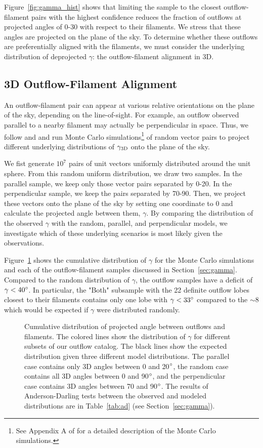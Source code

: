 \documentclass[twocolumn]{aastex63}
\begin{document}
Figure~\ref{fig:gamma_hist} shows that limiting the sample to the closest outflow-filament pairs with the highest confidence reduces the fraction of outflows at projected angles of 0-30\degr{} with respect to their filaments. We stress that these angles are projected on the plane of the sky. To determine whether these outflows are preferentially aligned with the filaments, we must consider the underlying distribution of deprojected $\gamma$: the outflow-filament alignment in 3D.

\subsection{3D Outflow-Filament Alignment}
An outflow-filament pair can appear at various relative orientations on the plane of the sky, depending on the line-of-sight. For example, an outflow observed parallel to a nearby filament may actually be perpendicular in space. Thus, we follow \citet{Stephens17} and \citet{Kong19} and run Monte Carlo simulations\footnote{See Appendix A of \citet{Stephens17} for a detailed description of the Monte Carlo simulations.} of random vector pairs to project different underlying distributions of $\gamma_{\rm 3D}$ onto the plane of the sky.

We fist generate $10^7$ pairs of unit vectors uniformly distributed around the unit sphere. From this random uniform distribution, we draw two samples. In the parallel sample, we keep only those vector pairs separated by 0-20\degr. In the perpendicular sample, we keep the pairs separated by 70-90\degr. Then, we project these vectors onto the plane of the sky by setting one coordinate to 0 and calculate the projected angle between them, $\gamma$. By comparing the distribution of the observed $\gamma$ with the random, parallel, and perpendicular models, we investigate which of these underlying scenarios is most likely given the observations.

Figure~\ref{fig:gamma_cdf} shows the cumulative distribution of $\gamma$ for the Monte Carlo simulations and each of the outflow-filament samples discussed in Section~\ref{sec:gamma}. Compared to the random distribution of $\gamma$, the outflow samples have a deficit of $\gamma < 40\mbox{$^\circ$}$. In particular, the "Both" subsample with the 22 definite outflow lobes closest to their filaments contains only one lobe with $\gamma < 33\mbox{$^\circ$}$ compared to the $\sim8$ which would be expected if $\gamma$ were distributed randomly.

\begin{figure}
\caption{Cumulative distribution of projected angle between outflows and filaments. The colored lines show the distribution of $\gamma$ for different subsets of our outflow catalog. The black lines show the expected distribution given three different model distributions. The parallel case contains only 3D angles between 0 and 20$\mbox{$^\circ$}$, the random case contains all 3D angles between 0 and 90$\mbox{$^\circ$}$, and the perpendicular case contains 3D angles between 70 and 90$\mbox{$^\circ$}$. The results of Anderson-Darling tests between the observed and modeled distributions are in Table~\ref{tab:ad} (see Section~\ref{sec:gamma}).\label{fig:gamma_cdf}}
\end{figure}
\end{document}
